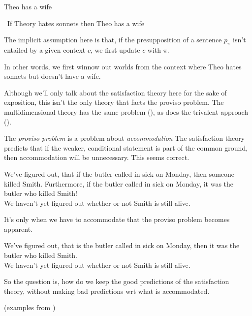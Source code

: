 \documentclass[nols,twoside,nofonts,nobib,nohyper]{tufte-handout}
\begin{document}
\ex\label{corr}Theo has a wife\xe

\ex~\label{bad}If Theory hates sonnets then Theo has a wife\xe

The implicit assumption here is that, if the presupposition of a sentence \(p_{\pi}\) isn't entailed by a given context \(c\), we first update \(c\) with \(\pi\).

In other words, we first winnow out worlds from the context where Theo hates sonnets but doesn't have a wife.

Although we'll only talk about the satisfaction theory here for the sake of exposition, this isn't the only theory that facts the proviso problem. The multidimensional theory has the same problem (\citealt{karttunenPeters1979}), as does the trivalent approach (\citealt{george2007,george2008,fox2013}).

\begin{tcolorbox}
  The \textit{proviso problem} is a problem about \textit{accommodation}
  \tcblower
  The satisfaction theory predicts that if the weaker, conditional statement is part of the common ground, then accommodation will be unnecessary. This seems correct.

  \ex
  We've figured out, that if the butler called in sick on Monday, then someone killed Smith. Furthermore, if the butler called in sick on Monday, it was the butler who killed Smith!\\
  \cmark We haven't yet figured out whether or not Smith is still alive.
  \xe

  \vspace{1ex}

  It's only when we have to accommodate that the proviso problem becomes apparent.

  \ex
  We've figured out, that is the butler called in sick on Monday, then it was the butler who killed Smith.\\
  \xmark We haven't yet figured out whether or not Smith is still alive.
  \xe

  \vspace{1ex}

  So the question is, how do we keep the good predictions of the satisfaction theory, without making bad predictions wrt what is accommodated.

  \vspace{1ex}

  (examples from \citealt{mandelkern2016})

\end{tcolorbox}
\end{document}
